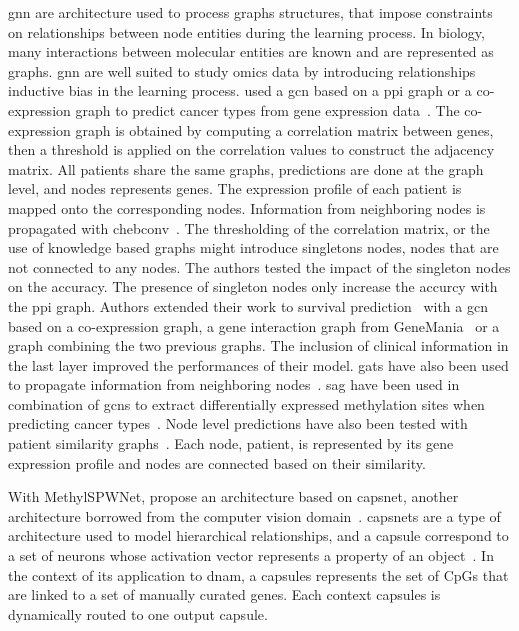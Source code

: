 \documentclass[../main.tex]{subfiles}
\begin{document}
	\Gls{gnn} are architecture used to process graphs structures, that impose constraints on relationships between node entities during the learning process.
	In biology, many interactions between molecular entities are known and are represented as graphs.
	\Gls{gnn} are well suited to study omics data by introducing relationships inductive bias in the learning process.
	\citeauthor{Ramirez2020} used a \gls{gcn} based on a \gls{ppi} graph or a co-expression graph to predict cancer types from gene expression data~\cite{Ramirez2020}.
	The co-expression graph is obtained by computing a correlation matrix between genes, then a threshold is applied on the correlation values to construct the adjacency matrix.
	All patients share the same graphs, predictions are done at the graph level, and nodes represents genes.
	The expression profile of each patient is mapped onto the corresponding nodes.
	Information from neighboring nodes is propagated with \gls{chebconv}~\cite{ChebConv}.
	The thresholding of the correlation matrix, or the use of knowledge based graphs might introduce singletons nodes, \ie{}nodes that are not connected to any nodes.
	The authors tested the impact of the singleton nodes on the accuracy.
	The presence of singleton nodes only increase the accurcy with the \gls{ppi} graph.
	Authors extended their work to survival prediction~\cite{Ramirez2021} with a \gls{gcn} based on a co-expression graph, a gene interaction graph from GeneMania~\cite{WardeFarley2010} or a graph combining the two previous graphs.
	The inclusion of clinical information in the last layer improved the performances of their model.
	\Glspl{gat} have also been used to propagate information from neighboring nodes~\cite{Xing2021}.
	\Gls{sag} have been used in combination of \glspl{gcn} to extract differentially expressed methylation sites when predicting cancer types~\cite{Jiang2023}.
	Node level predictions have also been tested with patient similarity graphs~\cite{Baul2022}.
	Each node, \ie{}patient, is represented by its gene expression profile and nodes are connected based on their similarity.

	\ifSubfilesClassLoaded{%
	}{
	}

	With MethylSPWNet, \citeauthor{levyMethylSPWNetMethylCapsNetBiologically2021a} propose an architecture based on \gls{capsnet}, another architecture borrowed from the computer vision domain~\cite{levyMethylSPWNetMethylCapsNetBiologically2021a}.
	\Glspl{capsnet} are a type of architecture used to model hierarchical relationships, and a capsule correspond to a set of neurons whose activation vector represents a property of an object~\cite{CapsNet}.
	In the context of its application to \gls{dnam}, a capsules represents the set of CpGs that are linked to a set of manually curated genes.
	Each context capsules is dynamically routed to one output capsule.
\end{document}
